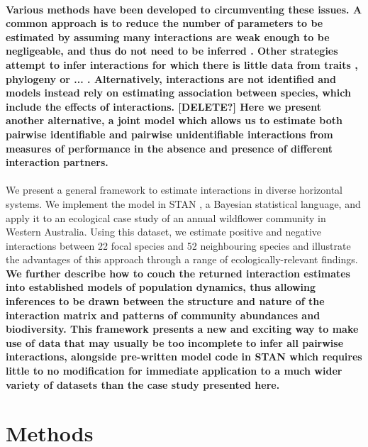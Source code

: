 \documentclass[a4,12pt]{article}
\begin{document}
\begin{refsection}
    \paragraph{} %
    \textbf{Various methods have been developed to circumventing these issues. A common approach is to reduce the number of parameters to be estimated by assuming many interactions are weak enough to be negligeable, and thus do not need to be inferred \parencite{Weiss-Lehman2022}. Other strategies attempt to infer interactions for which there is little data from traits \parencite{}, phylogeny \parencite{} or ... \parencite{Ovaskainen2017}. Alternatively, interactions are not identified and models instead rely on estimating association between species, which include the effects of interactions. [DELETE?] Here we present another alternative, a joint model which allows us to estimate both pairwise identifiable and pairwise unidentifiable interactions from measures of performance in the absence and presence of different interaction partners.}


    \paragraph{} 
    We present a general framework to estimate interactions in diverse horizontal systems. We implement the model in STAN \parencite{Carpenter2017}, a Bayesian statistical language, and apply it to an ecological case study of an annual wildflower community in Western Australia. Using this dataset, we estimate positive and negative interactions between 22 focal species and 52 neighbouring species and illustrate the advantages of this approach through a range of ecologically-relevant findings. \textbf{We further describe how to couch the returned interaction estimates into established models of population dynamics, thus allowing inferences to be drawn between the structure and nature of the interaction matrix and patterns of community abundances and biodiversity. This framework presents a new and exciting way to make use of data that may usually be too incomplete to infer all pairwise interactions, alongside pre-written model code in STAN which requires little to no modification for immediate application to a much wider variety of datasets than the case study presented here.}


\section{Methods}


\end{refsection}
\end{document}
